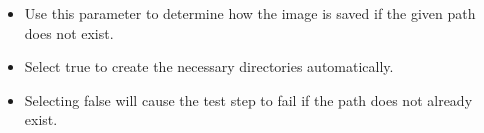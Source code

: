 \begin{itemize}
\item Use this parameter to determine how the image is saved if the given path does not exist.
\item Select true to create the necessary directories automatically.
\item Selecting false will cause the test step to fail if the path does not already exist.
\end{itemize}
